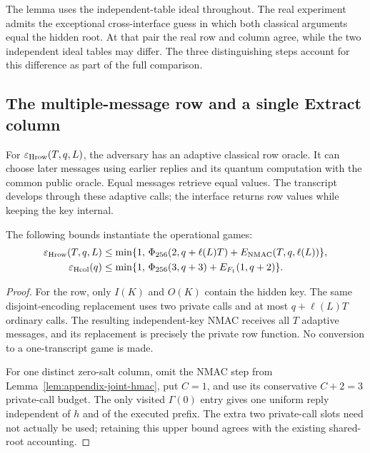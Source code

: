 The lemma uses the independent-table ideal throughout. The real
experiment admits the exceptional cross-interface guess in which both
classical arguments equal the hidden root. At that pair the real row and
column agree, while the two independent ideal tables may differ. The
three distinguishing steps account for this difference as part of the
full comparison.

\subsection{The multiple-message row and a single Extract column}

For $\varepsilon_{\rm Hrow}(T,q,L)$, the adversary has an adaptive classical
row oracle. It can choose later messages using earlier replies and its
quantum computation with the common public oracle. Equal messages retrieve
equal values. The transcript develops through these adaptive calls;
the interface returns row values while keeping the key internal.

\begin{lemma}
\label{lem:appendix-hmac-instances}
The following bounds instantiate the operational games:
\begin{align}
 \varepsilon_{\rm Hrow}(T,q,L)
 &\le\min\{1,\,
 \Phi_{256}(2,q+\ell(L)T)+E_{\rm NMAC}(T,q,\ell(L))\},
 \label{eq:appendix-multirow}\\
 \varepsilon_{\rm Hcol}(q)
 &\le\min\{1,\,
 \Phi_{256}(3,q+3)+E_{F_1}(1,q+2)\}.
 \label{eq:appendix-single-column}
\end{align}
\end{lemma}
\begin{proof}
For the row, only $I(K)$ and $O(K)$ contain the hidden key.
The same disjoint-encoding replacement uses two private calls and at most
$q+\ell(L)T$ ordinary calls. The resulting independent-key NMAC receives
all $T$ adaptive messages, and its replacement is precisely the private
row function. No conversion to a one-transcript game is made.

For one distinct zero-salt column, omit the NMAC step from
Lemma~\ref{lem:appendix-joint-hmac}, put $C=1$, and use its conservative
$C+2=3$ private-call budget. The only visited $\Gamma(0)$ entry gives one
uniform reply independent of $h$ and of the executed prefix. The extra
two private-call slots need not actually be used; retaining this upper
bound agrees with the existing shared-root accounting.
\end{proof}

